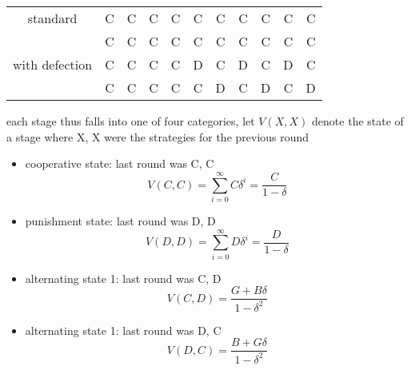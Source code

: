 \documentclass[a4paper, 10pt]{article}
\begin{document}
\begin{center}
   \begin{tabular}{c |c c c c c c c c c c}
      standard & C & C & C & C & C & C & C & C & C & C \\
               & C & C & C & C & C & C & C & C & C & C \\
     \hline
      with defection & C & C & C & C & D & C & D & C & D & C \\
                     & C & C & C & C & C & D & C & D & C & D \\
   \end{tabular}
\end{center}  

each stage thus falls into one of four categories, let $V(X, X)$ denote the state of a stage where X, X were the strategies for the previous round
\begin{itemize}
   \item cooperative state: last round was C, C
      \[
         V(C, C) = \sum_{i=0}^{\infty} C \delta^i = \frac{C}{1 - \delta}
      \]
   \item punishment state: last round was D, D 
      \[
         V(D, D) = \sum_{i=0}^{\infty} D \delta^i = \frac{D}{1- \delta}
      \]
   \item alternating state 1: last round was C, D
      \[
      V(C, D) = \frac{G + B \delta}{1-\delta^2}
      \]
   \item alternating state 1: last round was D, C
      \[
      V(D, C) = \frac{B + G \delta}{1-\delta^2}
      \]
\end{itemize}	
\end{document}
